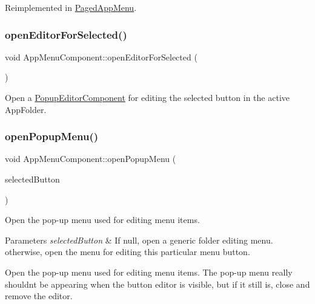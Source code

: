 Reimplemented in \mbox{\hyperlink{classPagedAppMenu_a1f79e778c41331eda6ed158448dc14e7}{Paged\+App\+Menu}}.

\mbox{\label{classAppMenuComponent_ad102ea087cd87c48e44e71b56e9023aa}} 
\subsubsection{\texorpdfstring{open\+Editor\+For\+Selected()}{openEditorForSelected()}}
{\footnotesize\ttfamily void App\+Menu\+Component\+::open\+Editor\+For\+Selected (\begin{DoxyParamCaption}{ }\end{DoxyParamCaption})\hspace{0.3cm}{\ttfamily [protected]}}

Open a \mbox{\hyperlink{classPopupEditorComponent}{Popup\+Editor\+Component}} for editing the selected button in the active App\+Folder. \mbox{\label{classAppMenuComponent_a1e2dcc587da7b7ffacdff89e0cbb310c}} 
\subsubsection{\texorpdfstring{open\+Popup\+Menu()}{openPopupMenu()}}
{\footnotesize\ttfamily void App\+Menu\+Component\+::open\+Popup\+Menu (\begin{DoxyParamCaption}\item[{\mbox{\hyperlink{classAppMenuButton_aeb692efb6a933970de8eac14e5e71544}{App\+Menu\+Button\+::\+Ptr}}}]{selected\+Button }\end{DoxyParamCaption})}

Open the pop-\/up menu used for editing menu items.


\begin{DoxyParams}{Parameters}
{\em selected\+Button} & If null, open a generic folder editing menu. otherwise, open the menu for editing this particular menu button.\\
\hline
\end{DoxyParams}
Open the pop-\/up menu used for editing menu items. The pop-\/up menu really shouldn\textquotesingle{}t be appearing when the button editor is visible, but if it still is, close and remove the editor.\mbox{\label{classAppMenuComponent_ad71e8e46bc22b655363acefcb2c071b5}} 
